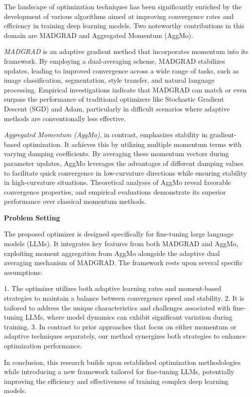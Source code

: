\documentclass{article} %
\begin{document}
The landscape of optimization techniques has been significantly enriched by the development of various algorithms aimed at improving convergence rates and efficiency in training deep learning models. Two noteworthy contributions in this domain are MADGRAD and Aggregated Momentum (AggMo).

\textit{MADGRAD} is an adaptive gradient method that incorporates momentum into its framework. By employing a dual-averaging scheme, MADGRAD stabilizes updates, leading to improved convergence across a wide range of tasks, such as image classification, segmentation, style transfer, and natural language processing. Empirical investigations indicate that MADGRAD can match or even surpass the performance of traditional optimizers like Stochastic Gradient Descent (SGD) and Adam, particularly in difficult scenarios where adaptive methods are conventionally less effective.

\textit{Aggregated Momentum (AggMo)}, in contrast, emphasizes stability in gradient-based optimization. It achieves this by utilizing multiple momentum terms with varying damping coefficients. By averaging these momentum vectors during parameter updates, AggMo leverages the advantages of different damping values to facilitate quick convergence in low-curvature directions while ensuring stability in high-curvature situations. Theoretical analyses of AggMo reveal favorable convergence properties, and empirical evaluations demonstrate its superior performance over classical momentum methods.

\textbf{Problem Setting}

The proposed optimizer is designed specifically for fine-tuning large language models (LLMs). It integrates key features from both MADGRAD and AggMo, exploiting moment aggregation from AggMo alongside the adaptive dual averaging mechanism of MADGRAD. The framework rests upon several specific assumptions:

1. The optimizer utilizes both adaptive learning rates and moment-based strategies to maintain a balance between convergence speed and stability.
2. It is tailored to address the unique characteristics and challenges associated with fine-tuning LLMs, where model dynamics can exhibit significant variation during training.
3. In contrast to prior approaches that focus on either momentum or adaptive techniques separately, our method synergizes both strategies to enhance optimization performance.

In conclusion, this research builds upon established optimization methodologies while introducing a new framework tailored for fine-tuning LLMs, potentially improving the efficiency and effectiveness of training complex deep learning models.
\end{document}
